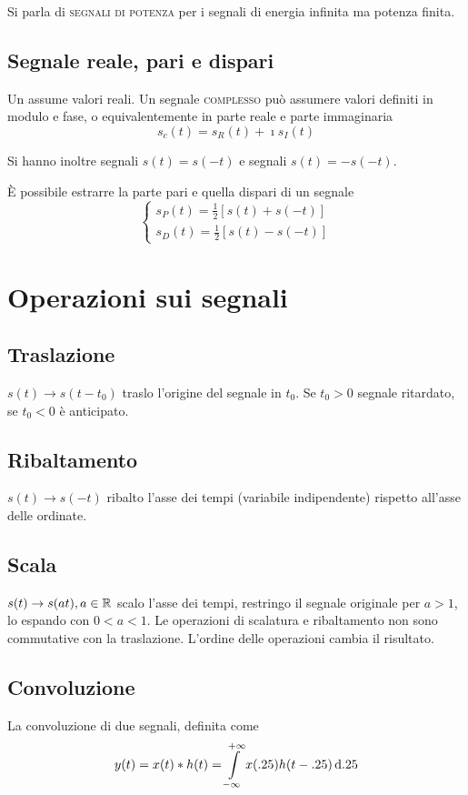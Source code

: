 Si parla di \textsc{segnali di potenza} per i segnali di energia infinita ma potenza finita.

\subsection{Segnale reale, pari e dispari}
Un  assume valori reali. Un segnale \textsc{complesso} può assumere valori definiti in modulo e fase, o equivalentemente in parte reale e parte immaginaria
\[s_c(t)=s_R(t)+\imath s_I(t)\]

Si hanno inoltre segnali  $s(t)=s(-t)$ e segnali  $s(t)=-s(-t)$.

\`{E} possibile estrarre la parte pari e quella dispari di un segnale
\[\begin{cases}
s_P(t)=\frac{1}{2}[s(t)+s(-t)] \\
s_D(t)=\frac{1}{2}[s(t)-s(-t)]
\end{cases}\]

\section{Operazioni sui segnali}
\subsection{Traslazione}
$s(t) \to s(t-t_0)$ traslo l'origine del segnale in $t_0$. Se $t_0>0$ segnale ritardato, se $t_0<0$ è anticipato.
\subsection{Ribaltamento}
$s(t) \to s(-t)$ ribalto l'asse dei tempi (variabile indipendente) rispetto all'asse delle ordinate.
\subsection{Scala}
$s(t)\to s(a t), a\in\mathbb{R}$ scalo l'asse dei tempi, restringo il segnale originale per $a>1$, lo espando con $0<a<1$.
Le operazioni di scalatura e ribaltamento non sono commutative con la traslazione. L'ordine delle operazioni cambia il risultato.
\subsection{Convoluzione}
La convoluzione di due segnali, definita come
\[y(t)=x(t)\ast  h(t)=\int\limits_{-\infty}^{+\infty}{x(.25)h(t-.25)}{\,\mathop{}\!\mathrm{d}{.25}}\]
